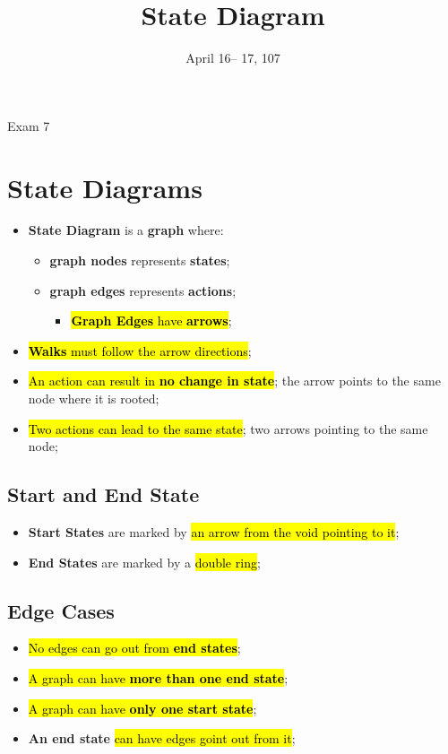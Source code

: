 \documentclass{note}
\date{April 16-- 17, 107}
\title{State Diagram}
\begin{document}
\begin{note}{Exam 7}

\section{State Diagrams}

\begin{itemize}
    \item \textbf{State Diagram} is a \textbf{graph} where:
    \begin{itemize}
        \item \textbf{graph nodes} represents \textbf{states};
        \item \textbf{graph edges} represents \textbf{actions};
        \begin{itemize}
            \item \hl{\textbf{Graph Edges} have \textbf{arrows}};
        \end{itemize}
    \end{itemize}
    
    \item \hl{\textbf{Walks} must follow the arrow directions};
    \item \hl{An action can result in \textbf{no change in state}}; the arrow points to the same node where it is rooted;
    \item \hl{Two actions can lead to the same state}; two arrows pointing to the same node;
\end{itemize}

    \subsection{Start and End State}

    \begin{itemize}
        \item \textbf{Start States} are marked by \hl{an arrow from the void pointing to it};
        \item \textbf{End States} are marked by a \hl{double ring};
    \end{itemize}

    \subsection{Edge Cases}

    \begin{itemize}
        \item \hl{No edges can go out from \textbf{end states}};
        \item \hl{A graph can have \textbf{more than one end state}};
        \item \hl{A graph can have \textbf{only one start state}};
        \item \textbf{An end state} \hl{can have edges goint out from it};
    \end{itemize}
    

\end{note}
\end{document}
